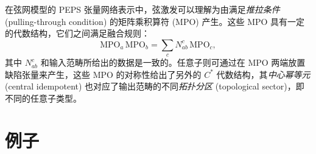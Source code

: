 在弦网模型的 PEPS 张量网络表示中，弦激发可以理解为由满足\emph{推拉条件} (pulling-through condition) 的矩阵乘积算符 (MPO) 产生。这些 MPO 具有一定的代数结构，它们之间满足融合规则：
\begin{equation}
  \text{MPO}_a \, \text{MPO}_b = \sum_c N_{ab}^c \, \text{MPO}_c,
\end{equation}
其中 $N_{ab}^c$ 和输入范畴所给出的数据是一致的。任意子则可通过在 MPO 两端放置缺陷张量来产生，这些 MPO 的对称性给出了另外的 $C^*$ 代数结构，其\emph{中心幂等元} (central idempotent) 也对应了输出范畴的不同\emph{拓扑分区} (topological sector)，即不同的任意子类型。

\section{例子}

